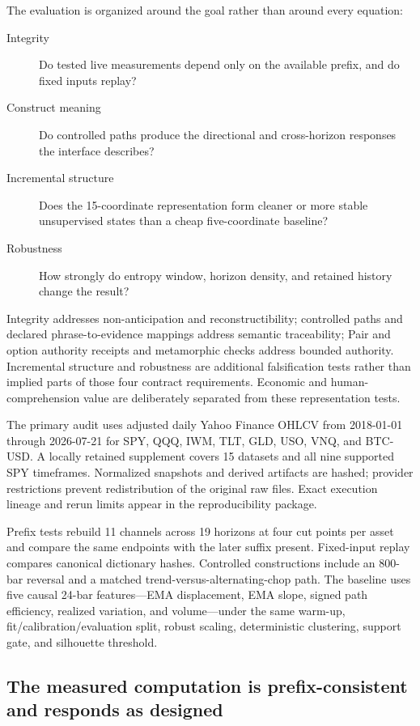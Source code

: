 \documentclass{article}
\begin{document}
The evaluation is organized around the goal rather than around every equation:
\begin{description}
    \item[Integrity] Do tested live measurements depend only on the available prefix, and do fixed inputs replay?
    \item[Construct meaning] Do controlled paths produce the directional and cross-horizon responses the interface describes?
    \item[Incremental structure] Does the 15-coordinate representation form cleaner or more stable unsupervised states than a cheap five-coordinate baseline?
    \item[Robustness] How strongly do entropy window, horizon density, and retained history change the result?
\end{description}
Integrity addresses non-anticipation and reconstructibility; controlled paths and declared phrase-to-evidence mappings address semantic traceability; Pair and option authority receipts and metamorphic checks address bounded authority. Incremental structure and robustness are additional falsification tests rather than implied parts of those four contract requirements.
Economic and human-comprehension value are deliberately separated from these representation tests.

The primary audit uses adjusted daily Yahoo Finance OHLCV from 2018-01-01 through 2026-07-21 for SPY, QQQ, IWM, TLT, GLD, USO, VNQ, and BTC-USD. A locally retained supplement covers 15 datasets and all nine supported SPY timeframes. Normalized snapshots and derived artifacts are hashed; provider restrictions prevent redistribution of the original raw files. Exact execution lineage and rerun limits appear in the reproducibility package.

Prefix tests rebuild 11 channels across 19 horizons at four cut points per asset and compare the same endpoints with the later suffix present. Fixed-input replay compares canonical dictionary hashes. Controlled constructions include an 800-bar reversal and a matched trend-versus-alternating-chop path. The baseline uses five causal 24-bar features---EMA displacement, EMA slope, signed path efficiency, realized variation, and volume---under the same warm-up, fit/calibration/evaluation split, robust scaling, deterministic clustering, support gate, and silhouette threshold.

\subsection{The measured computation is prefix-consistent and responds as designed}
\end{document}
